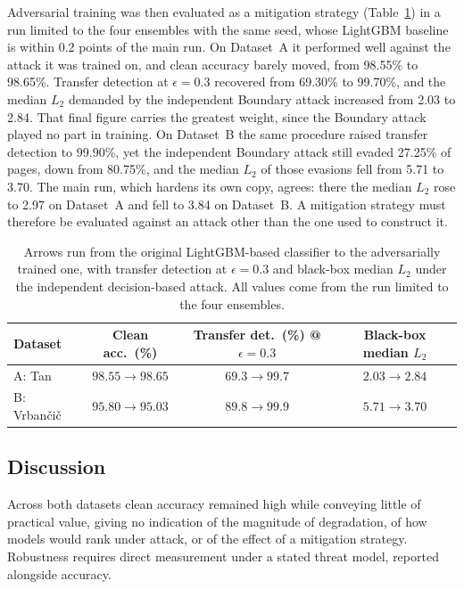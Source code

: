 \documentclass[runningheads]{llncs}
\begin{document}
Adversarial training was then evaluated as a mitigation strategy
(Table~\ref{tab:defense}) in a run limited to the four ensembles with the same
seed, whose LightGBM baseline is within 0.2 points of the main run. On Dataset~A it performed well against the attack it
was trained on, and clean accuracy barely moved, from 98.55\% to 98.65\%. Transfer detection at $\epsilon = 0.3$
recovered from 69.30\% to 99.70\%, and the median $L_2$ demanded by the
independent Boundary attack increased from 2.03 to 2.84. That final figure
carries the greatest weight, since the Boundary attack played no part in
training. On Dataset~B the same procedure raised transfer detection to
99.90\%, yet the independent Boundary attack still evaded 27.25\% of pages, down
from 80.75\%, and the median $L_2$ of those evasions fell from 5.71 to 3.70.
The main run, which hardens its own copy, agrees: there the median $L_2$
rose to 2.97 on Dataset~A and fell to 3.84 on Dataset~B. A mitigation strategy must therefore be evaluated against an attack
other than the one used to construct it.

\begin{table}[!htbp]
\centering
\caption{Arrows run from the original LightGBM-based classifier to the
adversarially trained one, with transfer detection at $\epsilon = 0.3$ and black-box
median $L_2$ under the independent decision-based attack. All values come from
the run limited to the four ensembles.}
\label{tab:defense}
\small
\setlength{\tabcolsep}{6pt}
\begin{tabular}{lccc}
\toprule
Dataset & Clean acc.\ (\%) & Transfer det.\ (\%) @ $\epsilon{=}0.3$ & Black-box median $L_2$ \\
\midrule
A: Tan              & $98.55 \rightarrow 98.65$ & $69.3 \rightarrow 99.7$ & $2.03 \rightarrow 2.84$ \\
B: Vrban\v{c}i\v{c} & $95.80 \rightarrow 95.03$ & $89.8 \rightarrow 99.9$ & $5.71 \rightarrow 3.70$ \\
\bottomrule
\end{tabular}
\end{table}

\subsection{Discussion}
\label{sec:discussion}

Across both datasets clean accuracy remained high while conveying little of
practical value, giving no indication of the magnitude of degradation, of how
models would rank under attack, or of the effect of a mitigation strategy.
Robustness requires direct measurement under a stated threat model, reported
alongside accuracy.
\end{document}
